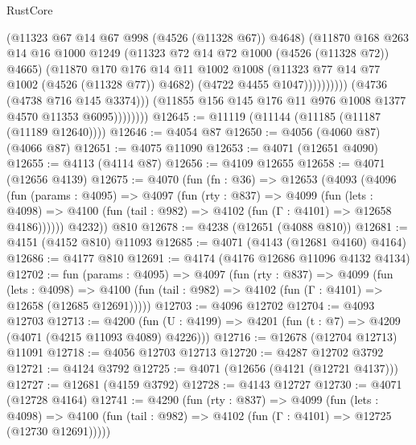 \begin{lexlean}{RustCore}
\begin{coremodule}
                                  (@11323 @67 @14 @67 @998 (@4526 (@11328 @67)) @4648)
                                  (@11870
                                    @168
                                    @263
                                    @14
                                    @16
                                    @1000
                                    @1249
                                    (@11323 @72 @14 @72 @1000 (@4526 (@11328 @72)) @4665)
                                    (@11870
                                      @170
                                      @176
                                      @14
                                      @11
                                      @1002
                                      @1008
                                      (@11323 @77 @14 @77 @1002 (@4526 (@11328 @77)) @4682)
                                      (@4722 @4455 @1047))))))))))
                    (@4736 (@4738 @716 @145 @3374)))
                  (@11855 @156 @145 @176 @11 @976 @1008 @1377 @4570 @11353 @6095))))))))
@12645 := @11119 (@11144 (@11185 (@11187 (@11189 @12640))))
@12646 := @4054 @87
@12650 := @4056 (@4060 @87) (@4066 @87)
@12651 := @4075 @11090
@12653 := @4071 (@12651 @4090)
@12655 := @4113 (@4114 @87)
@12656 := @4109 @12655
@12658 := @4071 (@12656 @4139)
@12675 := @4070
    (fun (fn : @36) =>
    @12653
      (@4093
        (@4096
          (fun (params : @4095) =>
          @4097
            (fun (rty : @837) =>
            @4099
              (fun (lets : @4098) =>
              @4100 (fun (tail : @982) => @4102 (fun (Γ : @4101) => @12658 @4186))))))
        @4232))
    @810
@12678 := @4238 (@12651 (@4088 @810))
@12681 := @4151 (@4152 @810) @11093
@12685 := @4071 (@4143 (@12681 @4160) @4164)
@12686 := @4177 @810
@12691 := @4174 (@4176 @12686 @11096 @4132 @4134)
@12702 := fun (params : @4095) =>
  @4097
    (fun (rty : @837) =>
    @4099
      (fun (lets : @4098) =>
      @4100 (fun (tail : @982) => @4102 (fun (Γ : @4101) => @12658 (@12685 @12691)))))
@12703 := @4096 @12702
@12704 := @4093 @12703
@12713 := @4200
    (fun (U : @4199) => @4201 (fun (t : @7) => @4209 (@4071 (@4215 @11093 @4089) @4226)))
@12716 := @12678 (@12704 @12713) @11091
@12718 := @4056 @12703 @12713
@12720 := @4287 @12702 @3792
@12721 := @4124 @3792
@12725 := @4071 (@12656 (@4121 (@12721 @4137)))
@12727 := @12681 (@4159 @3792)
@12728 := @4143 @12727
@12730 := @4071 (@12728 @4164)
@12741 := @4290
    (fun (rty : @837) =>
    @4099
      (fun (lets : @4098) =>
      @4100 (fun (tail : @982) => @4102 (fun (Γ : @4101) => @12725 (@12730 @12691)))))

\end{coremodule}
\end{lexlean}
